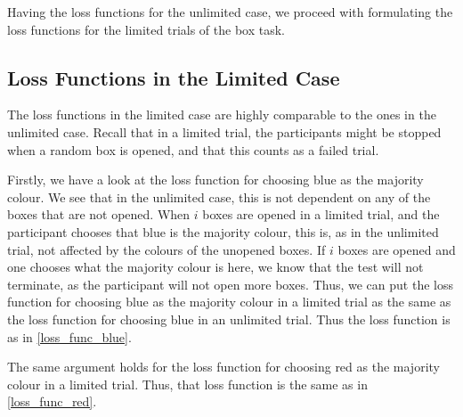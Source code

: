 Having the loss functions for the unlimited case, we proceed with formulating the loss functions for the limited trials of the box task. 

\subsection{Loss Functions in the Limited Case}
The loss functions in the limited case are highly comparable to the ones in the unlimited case. Recall that in a limited trial, the participants might be stopped when a random box is opened, and that this counts as a failed trial. 

Firstly, we have a look at the loss function for choosing blue as the majority colour. We see that in the unlimited case, this is not dependent on any of the boxes that are not opened. When $i$ boxes are opened in a limited trial, and the participant chooses that blue is the majority colour, this is, as in the unlimited trial, not affected by the colours of the unopened boxes. If $i$ boxes are opened and one chooses what the majority colour is here, we know that the test will not terminate, as the participant will not open more boxes. Thus, we can put the loss function for choosing blue as the majority colour in a limited trial as the same as the loss function for choosing blue in an unlimited trial. Thus the loss function is as in \eqref{loss_func_blue}.

The same argument holds for the loss function for choosing red as the majority colour in a limited trial. Thus, that loss function is the same as in \eqref{loss_func_red}.

